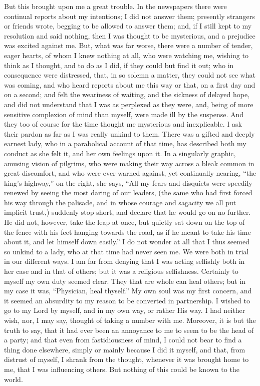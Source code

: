 But this brought upon me a great trouble. In the newspapers there
were continual reports about my intentions; I did not answer them;
presently strangers or friends wrote, begging to be allowed to answer
them; and, if I still kept to my resolution and said nothing, then I was
thought to be mysterious, and a prejudice was excited against me.
But, what was far worse, there were a number of tender, eager hearts, of
whom I knew nothing at all, who were watching me, wishing to think as I
thought, and to do as I did, if they could but find it out; who in
consequence were distressed, that, in so solemn a matter, they could not
see what was coming, and who heard reports about me this way or that, on
a first day and on a second; and felt the weariness of waiting, and the
sickness of delayed hope, and did not understand that I was as perplexed
as they were, and, being of more sensitive complexion of mind
than myself, were made ill by the suspense. And they too of course for
the time thought me mysterious and inexplicable. I ask their pardon as
far as I was really unkind to them. There was a gifted and deeply
earnest lady, who in a parabolical account of that time, has described
both my conduct as she felt it, and her own feelings upon it. In a
singularly graphic, amusing vision of pilgrims, who were making their
way across a bleak common in great discomfort, and who were ever warned
against, yet continually nearing, ``the king's highway,'' on the
right, she says, ``All my fears and disquiets were speedily renewed
by seeing the most daring of our leaders, (the same who had first forced
his way through the palisade, and in whose courage and sagacity we all
put implicit trust,) suddenly stop short, and declare that he would go
on no further. He did not, however, take the leap at once, but quietly
sat down on the top of the fence with his feet hanging towards the road,
as if he meant to take his time about it, and let himself down
easily.'' I do not wonder at all that I thus seemed so unkind to a
lady, who at that time had never seen me. We were both in trial in our
different ways. I am far from denying that I was acting selfishly both in her case and in that of
others; but it was a religious
selfishness. Certainly to myself my own duty seemed clear. They that are
whole can heal others; but in my case it was, ``Physician, heal
thyself.'' My own soul was my first concern, and it seemed an
absurdity to my reason to be converted in partnership. I wished to go to
my Lord by myself, and in my own way, or rather His way. I had
neither wish, nor, I may say, thought of taking a number with me. Moreover, it is but the truth to say, that it had ever been an
annoyance to me to seem to be the head of a party; and that even from
fastidiousness of mind, I could not bear to find a thing done elsewhere,
simply or mainly because I did it myself, and that, from distrust of
myself, I shrank from the thought, whenever it was brought home to me,
that I was influencing others. But nothing of this could be known to the
world.

